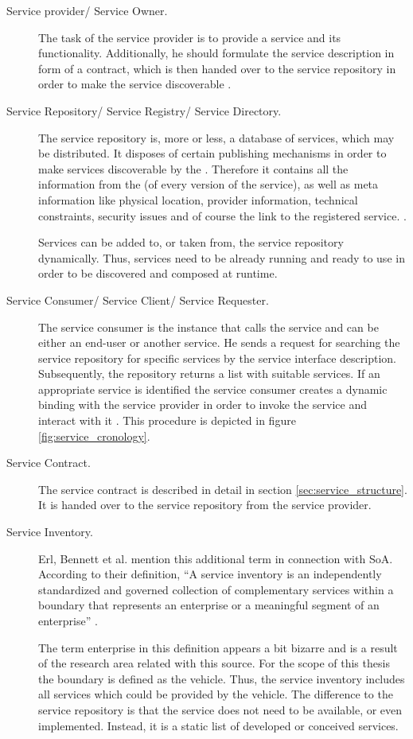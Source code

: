 \begin{description}
\item [Service provider/ Service Owner.] 
The task of the service provider is to provide a service and its functionality. Additionally, he should formulate the service description in form of a contract, which is then handed over to the service repository in order to make the service discoverable \cite{breivold}.

\item [Service Repository/ Service Registry/ Service Directory.]
The service repository is, more or less, a database of services, which may be distributed. It disposes of certain publishing mechanisms in order to make services discoverable by the . Therefore it contains all the information from the (of every version of the service), as well as meta information like physical location, provider information, technical constraints, security issues and of course the link to the registered service. \cite[p.60-61]{krafzig} \cite{breivold} \cite{converge}.

Services can be added to, or taken from, the service repository dynamically. Thus, services need to be already running and ready to use in order to be discovered and composed at runtime.

\item [Service Consumer/ Service Client/ Service Requester.]
The service consumer is the instance that calls the service and can be either an end-user or another service. He sends a request for searching the service repository for specific services by the service interface description. Subsequently, the repository returns a list with suitable services. If an appropriate service is identified the service consumer creates a dynamic binding with the service provider in order to invoke the service and interact with it \cite{breivold} \cite{converge}. This procedure is depicted in figure \ref{fig:service_cronology}.

\item [Service Contract.]
The service contract is described in detail in section \ref{sec:service_structure}. It is handed over to the service repository from the service provider.

\item [Service Inventory.]
Erl, Bennett et al. mention this additional term in connection with SoA. According to their definition, ``A service inventory is an independently standardized and governed collection of complementary services within a boundary that represents an enterprise or a meaningful segment of an enterprise'' \cite[p.41]{erl2011}. 

The term enterprise in this definition appears a bit bizarre and is a result of the research area related with this source. For the scope of this thesis the boundary is defined as the vehicle. Thus, the service inventory includes all services which could be provided by the vehicle. The difference to the service repository is that the service does not need to be available, or even implemented. Instead, it is a static list of developed or conceived services.
\end{description}

